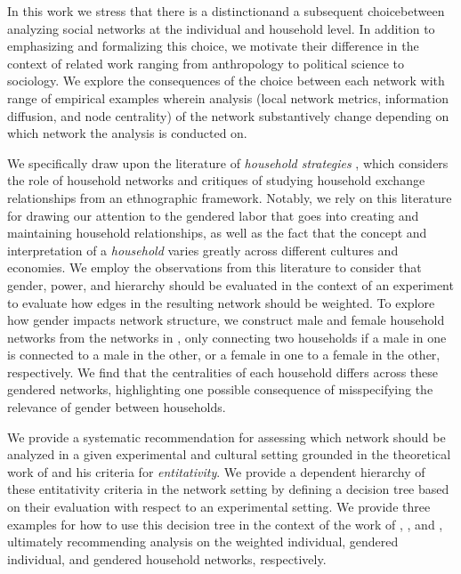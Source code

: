 In this work we stress that there is a distinction\textemdash and a subsequent choice\textemdash between analyzing social networks at the individual and household level. In addition to emphasizing and formalizing this choice, we motivate their difference in the context of related work ranging from anthropology to political science to sociology. We explore the consequences of the choice between each network with range of empirical examples wherein analysis (local network metrics, information diffusion, and node centrality) of the network substantively change depending on which network the analysis is conducted on. 

We specifically draw upon the literature of \textit{household strategies} \citep[e.g.,][]{werner1998, wallace2002household, niehof2011conceptualizing}, which considers the role of household networks and critiques of studying household exchange relationships from an ethnographic framework. Notably, we rely on this literature for drawing our attention to the gendered labor that goes into creating and maintaining household relationships, as well as the fact that the concept and interpretation of a \textit{household} varies greatly across different cultures and economies. We employ the observations from this literature to consider that gender, power, and hierarchy should be evaluated in the context of an experiment to evaluate how edges in the resulting network should be weighted. To explore how gender impacts network structure, we construct male and female household networks from the networks in \cite{banerjee2013}, only connecting two households if a male in one is connected to a male in the other, or a female in one to a female in the other, respectively. We find that the centralities of each household differs across these gendered networks, highlighting one possible consequence of misspecifying the relevance of gender between households.

We provide a systematic recommendation for assessing which network should be analyzed in a given experimental and cultural setting grounded in the theoretical work of \cite{campbell1958common} and his criteria for \textit{entitativity}. We provide a dependent hierarchy of these entitativity criteria in the network setting by defining a decision tree based on their evaluation with respect to an experimental setting. We provide three examples for how to use this decision tree in the context of the work of \cite{banerjee2013}, \cite{alexander2022algorithms}, and \cite{airoldi2024}, ultimately recommending analysis on the weighted individual, gendered individual, and gendered household networks, respectively.

